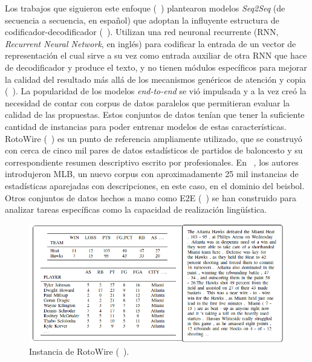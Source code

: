     Los trabajos que siguieron este enfoque (~\cite{lebret-etal-2016-neural,mei2016talk,wiseman-etal-2017-challenges}) plantearon modelos \emph{Seq2Seq} (de secuencia a secuencia, en español) que adoptan la 
influyente estructura de codificador-decodificador (~\cite{sutskever2014sequence}). Utilizan una red neuronal recurrente (RNN, \emph{Recurrent Neural Network}, en inglés) 
para codificar la entrada de un vector de representación el cual sirve a su vez como entrada auxiliar de otra RNN que hace de decodificador y produce el texto, y no tienen módulos 
específicos para mejorar la calidad del resultado más allá de los mecanismos gen\'ericos de atención y copia (~\cite{bahdanau2014neural,gu2016incorporating}). La popularidad de los modelos 
\emph{end-to-end} se vió impulsada y a la vez creó la necesidad de contar con corpus de datos paralelos que permitieran evaluar la calidad de las propuestas. Estos conjuntos de datos tenían que 
tener la suficiente cantidad de instancias para poder entrenar modelos de estas características. RotoWire (~\cite{wiseman-etal-2017-challenges}) es un punto de referencia ampliamente utilizado, que se construyó con cerca de 
cinco mil pares de datos estadísticos de partidos de baloncesto y su correspondiente resumen descriptivo escrito por profesionales. En ~\cite{puduppully2019data}, los autores introdujeron MLB, un nuevo corpus con aproximadamente 
25 mil instancias de estadísticas aparejadas con descripciones, en este caso, en el dominio del beisbol. Otros conjuntos de datos hechos a mano como E2E (~\cite{novikova2017e2e}) se han construido para analizar tareas espec\'ificas 
como la capacidad de realización lingüística.

        \begin{figure}[!]
            \begin{center}
                \includegraphics[width=\textwidth]{Graphics/rotowire_instancia.png}
            \end{center}
            \caption{Instancia de RotoWire (~\cite{wiseman-etal-2017-challenges}).}
            \label{fig_RotoWire}
        \end{figure}

